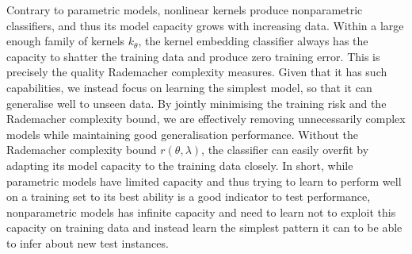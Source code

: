 \documentclass{article}
\begin{document}
	Contrary to parametric models, nonlinear kernels produce nonparametric classifiers, and thus its model capacity grows with increasing data. Within a large enough family of kernels $k_{\theta}$, the kernel embedding classifier always has the capacity to shatter the training data and produce zero training error. This is precisely the quality Rademacher complexity measures. Given that it has such capabilities, we instead focus on learning the simplest model, so that it can generalise well to unseen data. By jointly minimising the training risk and the Rademacher complexity bound, we are effectively removing unnecessarily complex models while maintaining good generalisation performance. Without the Rademacher complexity bound $r(\theta, \lambda)$, the classifier can easily overfit by adapting its model capacity to the training data closely. In short, while parametric models have limited capacity and thus trying to learn to perform well on a training set to its best ability is a good indicator to test performance, nonparametric models has infinite capacity and need to learn not to exploit this capacity on training data and instead learn the simplest pattern it can to be able to infer about new test instances.
	
\end{document}
